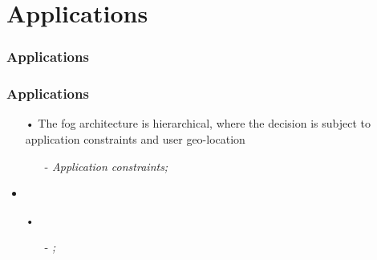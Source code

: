 \documentclass[10pt, pdf, xcolor=pdftex, dvipsnames, table]{beamer}
\begin{document}
\section[Applications]{Applications}

\begin{frame}
	\tableofcontents[currentsection]
\end{frame}

\begin{frame}
	\frametitle{Applications}
\end{frame}

\begin{frame}
	\frametitle{Applications}
 	\begin{block}{}
 		\begin{itemize}
 		    \item[•] The fog architecture is hierarchical, where the decision is subject to application constraints and user geo-location
 				\begin{itemize}
 		    		\item[-] \footnotesize\textit{Application constraints;}
 		    	\end{itemize}
 		    \item
 		    \item[•] 
 		    	\begin{itemize}
 		    		\item[-] \footnotesize\textit{;}
 		    	\end{itemize}
 		\end{itemize}
 	\end{block}
\end{frame}
\end{document}
